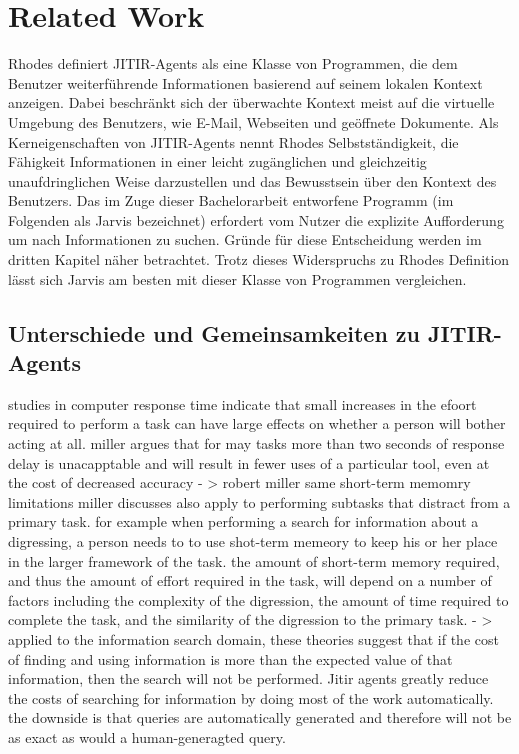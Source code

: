 \section{Related Work}
Rhodes\cite{rhodes2000just} definiert JITIR-Agents als eine Klasse von Programmen, die dem Benutzer weiterführende Informationen basierend auf seinem lokalen Kontext anzeigen. Dabei beschränkt sich der überwachte Kontext meist auf die virtuelle Umgebung des Benutzers, wie E-Mail, Webseiten und geöffnete Dokumente. Als Kerneigenschaften von JITIR-Agents nennt Rhodes Selbstständigkeit, die Fähigkeit Informationen in einer leicht zugänglichen und gleichzeitig unaufdringlichen Weise darzustellen und das Bewusstsein über den Kontext des Benutzers\cite{rhodes2000just}.
Das im Zuge dieser Bachelorarbeit entworfene Programm (im Folgenden als Jarvis bezeichnet) erfordert vom Nutzer die explizite Aufforderung um nach Informationen zu suchen. Gründe für diese Entscheidung werden im dritten Kapitel näher betrachtet. Trotz dieses Widerspruchs zu Rhodes Definition lässt sich Jarvis am besten mit dieser Klasse von Programmen vergleichen.

\subsection{Unterschiede und Gemeinsamkeiten zu JITIR-Agents}

studies in computer response time indicate that small increases in the efoort required to perform a task can have large effects on whether a person will bother acting at all.
miller argues that for may tasks more than two seconds of response delay is unacapptable and will result in fewer uses of a particular tool, even at the cost of decreased accuracy - > robert miller
same short-term memomry limitations miller discusses also apply to performing subtasks that distract from a primary task. for example when performing a search for information about a digressing, a person needs to to use shot-term memeory to keep his or her place in the larger framework of the task. the amount of short-term memory required, and thus the amount of effort required in the task, will depend on a number of factors including the complexity of the digression, the amount of time required to complete the task, and the similarity of the digression to the primary task.
- > applied to the information search domain, these theories suggest that if the cost of finding and using information is more than the expected value of that information, then the search will not be performed.
Jitir agents greatly reduce the costs of searching for information by doing most of the work automatically. the downside is that queries are automatically generated and therefore will not be as exact as would a human-generagted query.

